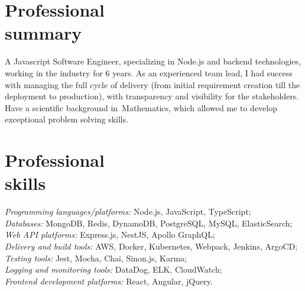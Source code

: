 \documentclass[margin, 10pt]{res} %
\begin{document}
\begin{resume}
\vspace*{-0.5cm}
\section{Professional\\ summary}
A Javascript Software Engineer, specializing in Node.js and backend technologies, working in the industry for 6 years.
As an experienced team lead, I had success with managing the full cycle of delivery (from initial requirement creation till the deployment to production), with transparency and visibility for the stakeholders.
Have a scientific background in~Mathematics, which allowed me to develop exceptional problem solving skills.

\section{Professional\\ skills}
{\sl Programming languages/platforms:} Node.js, JavaScript, TypeScript;\\
{\sl Databases:} MongoDB, Redis, DynamoDB, PostgreSQL, MySQL, ElasticSearch; \\
{\sl Web API platforms: } Express.js, NestJS, Apollo GraphQL; \\ 
{\sl Delivery and build tools:} AWS, Docker, Kubernetes, Webpack, Jenkins, ArgoCD; \\
{\sl Testing tools:} Jest, Mocha, Chai, Sinon.js, Karma; \\
{\sl Logging and monitoring tools:} DataDog, ELK, CloudWatch; \\
{\sl Frontend development platforms:} React, Angular, jQuery. \\

\end{resume}
\end{document}
